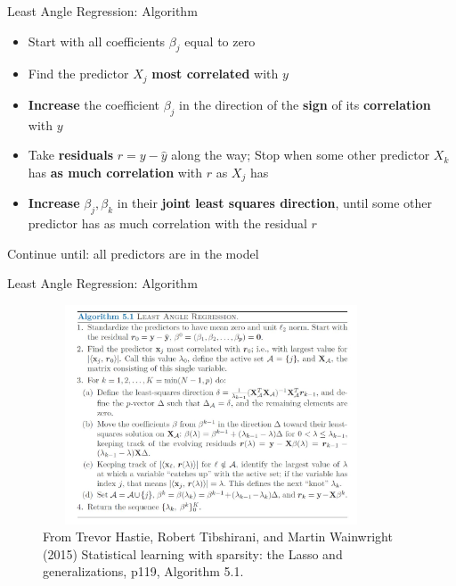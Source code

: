 \documentclass[handout]{beamer}
\begin{document}
\begin{frame}{Least Angle Regression: Algorithm}
    \begin{itemize}
        \item Start with all coefficients \(\beta_j\) equal to zero
        \item Find the predictor $X_j$ \textbf{most correlated} with $y$
        \item  \textbf{Increase} the coefficient \(\beta_j\) in the direction of the \textbf{sign} of its \textbf{correlation} with $y$
        \item Take \textbf{residuals} \(r=y-\hat{y}\) along the way; Stop when some other predictor \(X_k\) has \textbf{ as much correlation} with $r$ as \(X_j\) has
        \item \textbf{Increase} \(\beta_j,\beta_k\) in their \textbf{joint least squares direction}, until some other predictor has as much correlation with the residual $r$
    \end{itemize}
Continue until: all predictors are in the model
\end{frame}

\begin{frame}{Least Angle Regression: Algorithm}
\begin{figure}[h]
\centering
\includegraphics[width=10cm,height=6.5cm]{img/LARS}
\caption{From Trevor Hastie, Robert Tibshirani, and Martin Wainwright (2015) Statistical learning with sparsity: the Lasso and generalizations, p119, Algorithm 5.1.}
\end{figure}
\end{frame}
\end{document}
